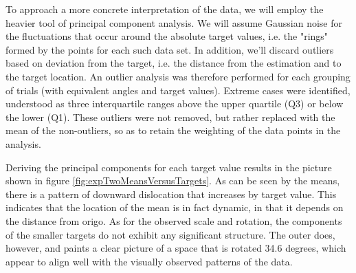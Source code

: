 To approach a more concrete interpretation of the data, we will employ the heavier tool of principal component analysis. We will assume Gaussian noise for the fluctuations that occur around the absolute target values, i.e. the "rings" formed by the points for each such data set. In addition, we'll discard outliers based on  deviation from the target, i.e. the distance from the estimation and to the target location. An outlier analysis was therefore performed for each grouping of trials (with equivalent angles and target values). Extreme cases were identified,  understood as three interquartile ranges above the upper quartile (Q3) or below the lower (Q1). These outliers were not removed, but rather replaced with the mean of the non-outliers, so as to retain the weighting of the data points in the analysis.

Deriving the principal components for each target value results in the picture shown in figure \ref{fig:expTwoMeansVersusTargets}. As can be seen by the means, there is a pattern of downward dislocation that increases by target value. This indicates that the location of the mean is in fact dynamic, in that it depends on the distance from origo. As for the observed scale and rotation, the components of the smaller targets do not exhibit any significant structure. The outer does, however, and paints a clear picture of a space that is rotated 34.6 degrees, which appear to align well with the visually observed patterns of the data. %





